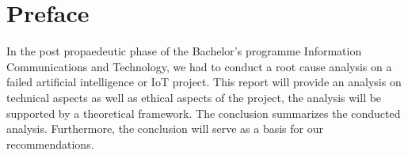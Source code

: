 \chapter*{Preface}

In the post propaedeutic phase of the Bachelor’s programme Information Communications and Technology, we had to conduct a root cause analysis
on a failed artificial intelligence or IoT project. This report will provide an analysis on technical aspects as well as ethical
aspects of the project, the analysis will be supported by a theoretical framework. The conclusion summarizes the conducted analysis.
Furthermore, the conclusion will serve as a basis for our recommendations.